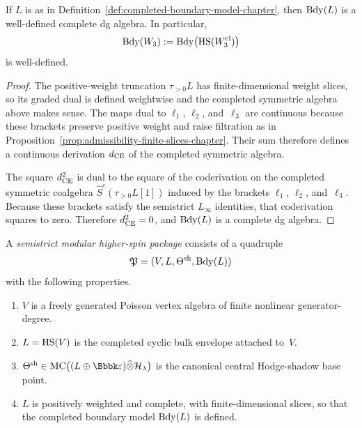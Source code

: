 \begin{proposition}
\label{prop:well-definedness-completed-boundary-model-chapter}
If $L$ is as in Definition~\ref{def:completed-boundary-model-chapter}, then $\operatorname{Bdy}(L)$ is a well-defined complete dg algebra. In particular,
\[
\operatorname{Bdy}(W_3):=\operatorname{Bdy}\bigl(\operatorname{HS}(W_3^{\mathrm{cl}})\bigr)
\]
is well-defined.
\end{proposition}

\begin{proof}
The positive-weight truncation $\tau_{>0}L$ has finite-dimensional weight slices, so its graded dual is defined weightwise and the completed symmetric algebra above makes sense. The maps dual to $\ell_1$, $\ell_2$, and~$\ell_3$ are continuous because these brackets preserve positive weight and raise filtration as in Proposition~\ref{prop:admissibility-finite-slices-chapter}. Their sum therefore defines a continuous derivation $d_{\operatorname{CE}}$ of the completed symmetric algebra.

The square $d_{\operatorname{CE}}^2$ is dual to the square of the coderivation on the completed symmetric coalgebra $\widehat{S}^c(\tau_{>0}L[1])$ induced by the brackets $\ell_1$, $\ell_2$, and~$\ell_3$. Because these brackets satisfy the semistrict $L_\infty$ identities, that coderivation squares to zero. Therefore $d_{\operatorname{CE}}^2=0$, and $\operatorname{Bdy}(L)$ is a complete dg algebra.\qedhere
\end{proof}

\begin{definition}
\label{def:semistrict-modular-higher-spin-package-chapter}
A \emph{semistrict modular higher-spin package} consists of a quadruple
\[
\mathfrak P=(V,L,\Theta^{\mathrm{sh}},\operatorname{Bdy}(L))
\]
with the following properties.
\begin{enumerate}[label=\textup{(\roman*)}]
 \item $V$ is a freely generated Poisson vertex algebra of finite nonlinear generator-degree.
 \item $L=\operatorname{HS}(V)$ is the completed cyclic bulk envelope attached to~$V$.
 \item $\Theta^{\sh}\in \MC\bigl((L\oplus\Bbbk\varepsilon)\widehat{\otimes}\mathcal H_{\lambda}\bigr)$ is the canonical central Hodge-shadow base point.
 \item $L$ is positively weighted and complete, with finite-dimensional slices, so that the completed boundary model $\operatorname{Bdy}(L)$ is defined.
\end{enumerate}
\end{definition}

